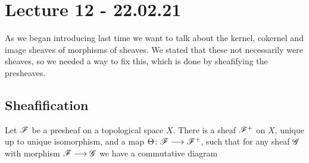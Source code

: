 
\section{Lecture 12 - 22.02.21}

As we began introducing last time we want to talk about the kernel, cokernel and image sheaves of morphisms of sheaves. We stated that these not necessarily were sheaves, so we needed a way to fix this, which is done by sheafifying the presheaves. 

\subsection{Sheafification}

\begin{proposition}
Let $\mathscr{F}$ be a presheaf on a topological space $X$. There is a sheaf $\mathscr{F}^+$ on $X$, unique up to unique isomorphism, and a map $\Theta\colon\mathscr{F}\longrightarrow\mathscr{F}^+$, such that for any sheaf $\mathscr{G}$ with morphism $\mathscr{F}\longrightarrow\mathscr{G}$ we have a commutative diagram
\begin{center}
\end{center}
\end{proposition}
